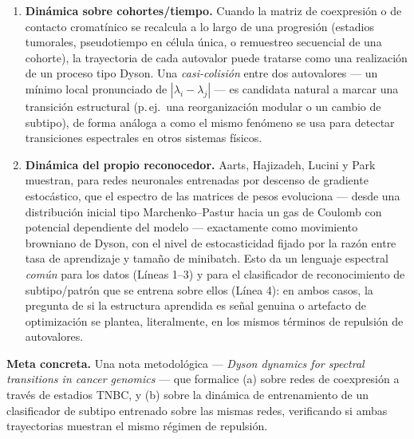 \documentclass[11pt]{article}
\begin{document}
\begin{enumerate}[label=(\alph*)]
    \item \textbf{Dinámica sobre cohortes/tiempo.} Cuando la matriz de coexpresión o de contacto cromatínico se recalcula a lo largo de una progresión (estadios tumorales, pseudotiempo en célula única, o remuestreo secuencial de una cohorte), la trayectoria de cada autovalor puede tratarse como una realización de un proceso tipo Dyson. Una \emph{casi-colisión} entre dos autovalores --- un mínimo local pronunciado de $|\lambda_i-\lambda_j|$ --- es candidata natural a marcar una transición estructural (p.\,ej.\ una reorganización modular o un cambio de subtipo), de forma análoga a como el mismo fenómeno se usa para detectar transiciones espectrales en otros sistemas físicos.
    \item \textbf{Dinámica del propio reconocedor.} Aarts, Hajizadeh, Lucini y Park \cite{aarts2024} muestran, para redes neuronales entrenadas por descenso de gradiente estocástico, que el espectro de las matrices de pesos evoluciona --- desde una distribución inicial tipo Marchenko--Pastur hacia un gas de Coulomb con potencial dependiente del modelo --- exactamente como movimiento browniano de Dyson, con el nivel de estocasticidad fijado por la razón entre tasa de aprendizaje y tamaño de minibatch. Esto da un lenguaje espectral \emph{común} para los datos (Líneas 1--3) y para el clasificador de reconocimiento de subtipo/patrón que se entrena sobre ellos (Línea 4): en ambos casos, la pregunta de si la estructura aprendida es señal genuina o artefacto de optimización se plantea, literalmente, en los mismos términos de repulsión de autovalores.
\end{enumerate}

\textbf{Meta concreta.} Una nota metodológica --- \emph{Dyson dynamics for spectral transitions in cancer genomics} --- que formalice (a) sobre redes de coexpresión a través de estadios TNBC, y (b) sobre la dinámica de entrenamiento de un clasificador de subtipo entrenado sobre las mismas redes, verificando si ambas trayectorias muestran el mismo régimen de repulsión.
\end{document}
